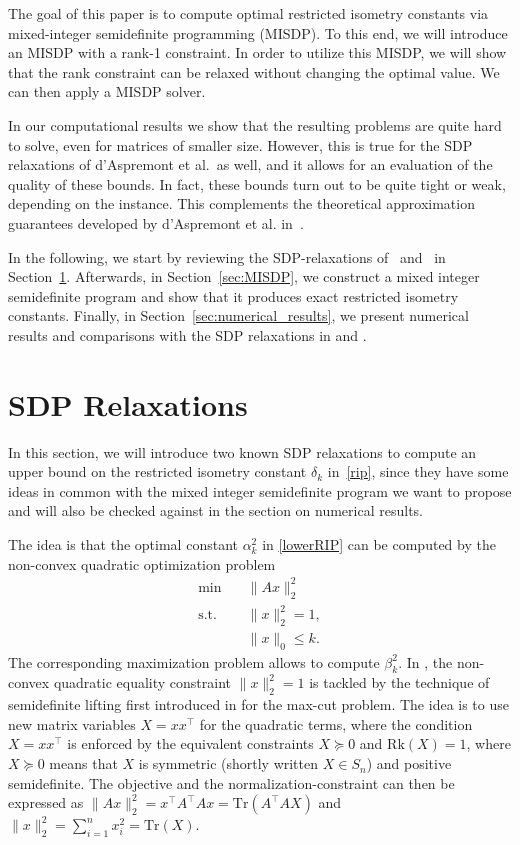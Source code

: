 \documentclass[journal]{IEEEtran}
\newcommand{\Norm}[2]{\lVert{#1}\rVert_{#2}}
\newcommand{\T}{^{\top}}
\newcommand{\Tr}{\text{Tr}}
\newcommand{\Rk}{\text{Rk}}
\begin{document}
The goal of this paper is to compute optimal restricted isometry constants
via mixed-integer semidefinite programming (MISDP). To this end, we will
introduce an MISDP with a rank-1 constraint. In order to utilize this
MISDP, we will show that the rank constraint can be relaxed without
changing the optimal value. We can then apply a MISDP solver.

In our computational results we show that the resulting problems are quite
hard to solve, even for matrices of smaller size. However, this is true for
the SDP relaxations of d'Aspremont et al.\ as well, and it allows for an
evaluation of the quality of these bounds.  In fact, these bounds turn out
to be quite tight or weak, depending on the instance. This complements the
theoretical approximation guarantees developed by d'Aspremont et
al. in~\cite{AspBG14}.

In the following, we start by reviewing the SDP-relaxations of~\cite{Asp08}
and~\cite{Asp07} in Section~\ref{sec:SDPrelax}.  Afterwards, in
Section~\ref{sec:MISDP}, we construct a mixed integer semidefinite
program and show that it produces exact restricted isometry
constants. Finally, in Section~\ref{sec:numerical_results}, we present
numerical results and comparisons with the SDP relaxations in \cite{Asp08}
and \cite{Asp07}.


\section{SDP Relaxations}
\label{sec:SDPrelax}

\noindent
In this section, we will introduce two known SDP relaxations to compute an upper bound on the restricted isometry constant $\delta_k$ in~\eqref{rip}, since they have some ideas in common with the mixed integer semidefinite program we want to 
propose and will also be checked against in the section on numerical
results.

The idea is that the optimal constant $\alpha_k^2$ in \eqref{lowerRIP} can be computed
by the non-convex quadratic optimization problem
\begin{align}\label{QP}
 \min \quad & \Norm{Ax}{2}^2 \nonumber \\
 \text{s.t.} \quad & \Norm{x}{2}^2 = 1, \tag{QP} \\
 & \Norm{x}{0} \leq k. \nonumber
\end{align}
The corresponding maximization problem allows to compute $\beta_k^2$. In \cite{Asp07}, the non-convex quadratic equality constraint $\Norm{x}{2}^2 = 1$ is tackled by the technique of semidefinite lifting first introduced in \cite{GW95} 
for the max-cut problem. The idea is to use new matrix variables $X=xx\T$ for the quadratic terms, where the condition $X=xx\T$ is enforced by the equivalent constraints $X \succeq 0$ and $\Rk(X) = 1$, where 
$X \succeq 0$ means that $X$ is symmetric (shortly written $X \in S_n$) and positive semidefinite. The objective and the normalization-constraint can then be expressed as  $\Norm{Ax}{2}^2 = x\T A\T Ax =
\Tr(A\T A X)$ and $\Norm{x}{2}^2 = \sum_{i=1}^n x_i^2 = \Tr(X)$. 
\end{document}
